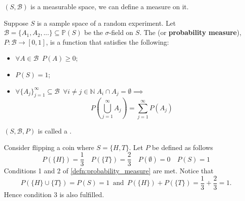 \documentclass[notoc,notitlepage]{tufte-book}
\begin{document}
 $(S, \mathscr{B})$ is a measurable space, we can define a measure on it.

\begin{defn}\label{defn:probability_measure}
  Suppose $S$ is a sample space of a random experiment. Let $\mathscr{B} = \{A_1, A_2, ...\} \subseteq \mathbb{P}(S)$ be the $\sigma$-field on $S$. The  (or \textbf{probability measure}), $P : \mathscr{B} \to [0, 1]$, is a function that satisfies the following:
  \begin{itemize}
    \item $\forall A \in \mathscr{B} \enspace P(A) \geq 0$;
    \item $P(S) = 1$;
    \item $\forall \{A_j\}_{j = 1}^{\infty} \subseteq \mathscr{B} \enspace \forall i \neq j \in \mathbb{N} \; A_i \cap A_j = \emptyset \implies$
      \begin{equation}\label{eq:probability_of_union_of_disjoint_sets}
        P \left( \bigcup_{j=1}^{\infty} A_j \right) = \sum_{j=1}^{\infty} P(A_j)
      \end{equation}
  \end{itemize}
  $(S, \mathscr{B}, P)$ is called a .
\end{defn}

\begin{eg}
  \label{eg:probability_measure}
  Consider flipping a coin where $S = \{H, T\}$. Let $P$ be defined as follows
  \begin{equation*}
    P(\{H\}) = \frac{1}{3} \quad P(\{T\}) = \frac{2}{3} \quad P(\emptyset) = 0 \quad  P(S) = 1
  \end{equation*}
  Conditions 1 and 2 of \cref{defn:probability_measure} are met. Notice that
  \begin{equation*}
    P(\{H\} \cup \{T\}) = P(S) = 1 \enspace \text{and} \enspace P(\{H\}) + P(\{T\}) = \frac{1}{3} + \frac{2}{3} = 1.
  \end{equation*}
  Hence condition 3 is also fulfilled.
\end{eg}
\end{document}
